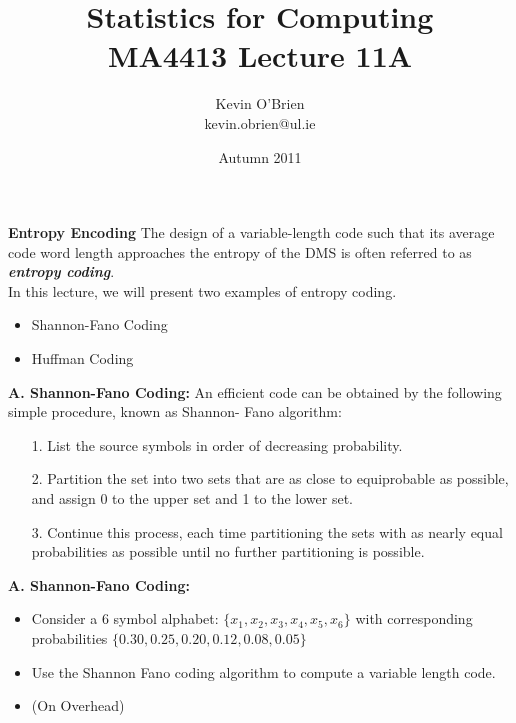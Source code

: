 ﻿\documentclass[a4]{beamer}
\title[MA4413]{Statistics for Computing \\ {\normalsize MA4413 Lecture 11A}}
\author[Kevin O'Brien]{Kevin O'Brien \\ {\scriptsize kevin.obrien@ul.ie}}
\date{Autumn 2011}
\institute[Maths \& Stats]{Dept. of Mathematics \& Statistics, \\ University \textit{of} Limerick}
\begin{document}

\medskip
\noindent \textbf{Entropy Encoding}
The design of a variable-length code such that its average code word length approaches the
entropy of the DMS is often referred to as \textbf{\emph{entropy coding}}.\\ \bigskip In this lecture, we will present two examples of
entropy coding.
\begin{itemize}
\item Shannon-Fano Coding
\item Huffman Coding
\end{itemize}

\medskip
\noindent \textbf{A. Shannon-Fano Coding:}
An efficient code can be obtained by the following simple procedure, known as
Shannon- Fano algorithm:
\begin{itemize}
\item[1.] List the source symbols in order of decreasing probability.
\item[2.] Partition the set into two sets that are as close to equiprobable as possible, and assign 0 to the
upper set and 1 to the lower set.
\item[3.] Continue this process, each time partitioning the sets with as nearly equal probabilities as possible until no further partitioning is possible.
\end{itemize}

\medskip
\noindent \textbf{A. Shannon-Fano Coding:}
\begin{itemize}
\item Consider a 6 symbol alphabet: $\{x_1, x_2, x_3, x_4, x_5,x_6\}$ with corresponding probabilities $\{0.30, 0.25, 0.20, 0.12, 0.08,0.05\}$
\item Use the Shannon Fano coding algorithm to compute a variable length code.
\item (On Overhead)
\end{itemize}
\end{document}
